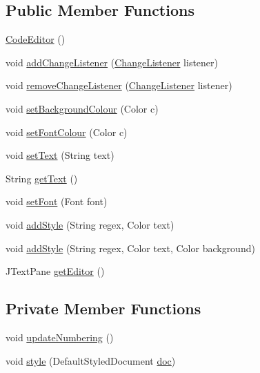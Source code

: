 \subsection*{Public Member Functions}
\begin{DoxyCompactItemize}
\item 
\hyperlink{classqlib_1_1ide_1_1CodeEditor_a9f3e1be7ea989d2011bf7d419341405c}{Code\+Editor} ()
\item 
void \hyperlink{classqlib_1_1ide_1_1CodeEditor_a89f62319ae0b01df34fa6ad8f06ddb10}{add\+Change\+Listener} (\hyperlink{interfaceqlib_1_1ide_1_1CodeEditor_1_1ChangeListener}{Change\+Listener} listener)
\item 
void \hyperlink{classqlib_1_1ide_1_1CodeEditor_ab6e32fe9c4f6535ee81fe69d4a77c8f2}{remove\+Change\+Listener} (\hyperlink{interfaceqlib_1_1ide_1_1CodeEditor_1_1ChangeListener}{Change\+Listener} listener)
\item 
void \hyperlink{classqlib_1_1ide_1_1CodeEditor_aabec5fb27bf75e4bb805240dc22c9875}{set\+Background\+Colour} (Color c)
\item 
void \hyperlink{classqlib_1_1ide_1_1CodeEditor_ae1b405cb3544e1869f229e0dbc1a4b0a}{set\+Font\+Colour} (Color c)
\item 
void \hyperlink{classqlib_1_1ide_1_1CodeEditor_a8686347c695b958ea8a5e8737cc59a1f}{set\+Text} (String text)
\item 
String \hyperlink{classqlib_1_1ide_1_1CodeEditor_a7cf3ac3837b11ee6494d45bb7e3d2435}{get\+Text} ()
\item 
void \hyperlink{classqlib_1_1ide_1_1CodeEditor_a65a9670ed0303c4acdaa53b45cc8b5d8}{set\+Font} (Font font)
\item 
void \hyperlink{classqlib_1_1ide_1_1CodeEditor_a5a8026e92f259481f31e26dcbab0e5e2}{add\+Style} (String regex, Color text)
\item 
void \hyperlink{classqlib_1_1ide_1_1CodeEditor_a50cf32315b6cb4d3358a2d00adbae74a}{add\+Style} (String regex, Color text, Color background)
\item 
J\+Text\+Pane \hyperlink{classqlib_1_1ide_1_1CodeEditor_a15327f7a8960ee54f65e4aca0b8e0c69}{get\+Editor} ()
\end{DoxyCompactItemize}
\subsection*{Private Member Functions}
\begin{DoxyCompactItemize}
\item 
void \hyperlink{classqlib_1_1ide_1_1CodeEditor_accee26f5cf7da53ffda849ab6d4741e0}{update\+Numbering} ()
\item 
void \hyperlink{classqlib_1_1ide_1_1CodeEditor_a2fccea5703e28988470c1e4634316ac8}{style} (Default\+Styled\+Document \hyperlink{classqlib_1_1ide_1_1CodeEditor_a89cfdfd40de46ae17636669521f7c7e2}{doc})
\end{DoxyCompactItemize}
